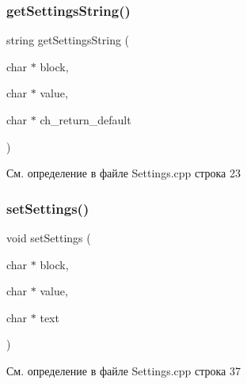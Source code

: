 \subsubsection{\texorpdfstring{get\+Settings\+String()}{getSettingsString()}}
{\footnotesize\ttfamily string get\+Settings\+String (\begin{DoxyParamCaption}\item[{char $\ast$}]{block,  }\item[{char $\ast$}]{value,  }\item[{char $\ast$}]{ch\+\_\+return\+\_\+default }\end{DoxyParamCaption})}



См. определение в файле Settings.\+cpp строка 23

\mbox{\label{group__settingscpp_ga463e32ccb37f9478b0e62ee0d21c5999}} 
\subsubsection{\texorpdfstring{set\+Settings()}{setSettings()}}
{\footnotesize\ttfamily void set\+Settings (\begin{DoxyParamCaption}\item[{char $\ast$}]{block,  }\item[{char $\ast$}]{value,  }\item[{char $\ast$}]{text }\end{DoxyParamCaption})}



См. определение в файле Settings.\+cpp строка 37


